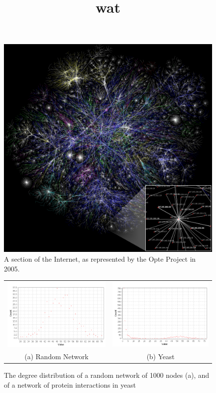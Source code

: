 \begin{figure}[!h]
	\title{wat}
	\begin{center}
		\includegraphics[scale=0.15]{images/Internet_map_1024.jpg}
	\end{center}
	\caption{A section of the Internet, as represented by the Opte Project in 2005.}
	\label{opte}
\end{figure}


\begin{figure}
	\begin{tabular}{cc}
		\includegraphics[width=65mm]{images/random-degree-distribution.png} &   \includegraphics[width=65mm]{images/yeast-degree-distribution.png} \\
		(a) Random Network & (b) Yeast \\[6pt]
	\end{tabular}
	\caption{The degree distribution of a random network of 1000 nodes (a), and of a network of protein interactions in yeast\do}
	\label{power}
\end{figure}


